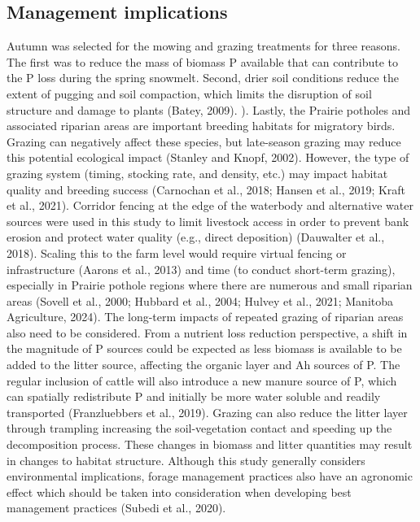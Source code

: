 \documentclass[
]{agujournal2019}
\begin{document}
\subsection{Management implications}\label{management-implications}

Autumn was selected for the mowing and grazing treatments for three
reasons. The first was to reduce the mass of biomass P available that
can contribute to the P loss during the spring snowmelt. Second, drier
soil conditions reduce the extent of pugging and soil compaction, which
limits the disruption of soil structure and damage to plants (Batey,
2009). ). Lastly, the Prairie potholes and associated riparian areas are
important breeding habitats for migratory birds. Grazing can negatively
affect these species, but late-season grazing may reduce this potential
ecological impact (Stanley and Knopf, 2002). However, the type of
grazing system (timing, stocking rate, and density, etc.) may impact
habitat quality and breeding success (Carnochan et al., 2018; Hansen et
al., 2019; Kraft et al., 2021). Corridor fencing at the edge of the
waterbody and alternative water sources were used in this study to limit
livestock access in order to prevent bank erosion and protect water
quality (e.g., direct deposition) (Dauwalter et al., 2018). Scaling this
to the farm level would require virtual fencing or infrastructure
(Aarons et al., 2013) and time (to conduct short-term grazing),
especially in Prairie pothole regions where there are numerous and small
riparian areas (Sovell et al., 2000; Hubbard et al., 2004; Hulvey et
al., 2021; Manitoba Agriculture, 2024). The long-term impacts of
repeated grazing of riparian areas also need to be considered. From a
nutrient loss reduction perspective, a shift in the magnitude of P
sources could be expected as less biomass is available to be added to
the litter source, affecting the organic layer and Ah sources of P. The
regular inclusion of cattle will also introduce a new manure source of
P, which can spatially redistribute P and initially be more water
soluble and readily transported (Franzluebbers et al., 2019). Grazing
can also reduce the litter layer through trampling increasing the
soil-vegetation contact and speeding up the decomposition process. These
changes in biomass and litter quantities may result in changes to
habitat structure. Although this study generally considers environmental
implications, forage management practices also have an agronomic effect
which should be taken into consideration when developing best management
practices (Subedi et al., 2020).
\end{document}

